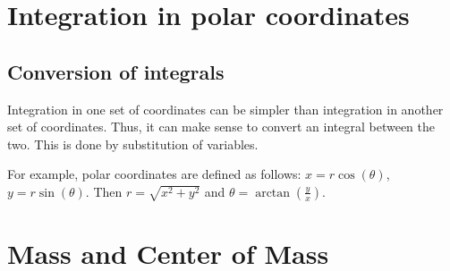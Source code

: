 \documentclass[letterpaper,11pt]{article}
\begin{document}
\section*{Integration in polar coordinates}
\subsection*{Conversion of integrals}
Integration in one set of coordinates can be simpler than integration in another set of coordinates.
Thus, it can make sense to convert an integral between the two.
This is done by substitution of variables.

For example, polar coordinates are defined as follows: $x = r \cos(\theta)$, $y = r \sin(\theta)$.
Then $r = \sqrt{x^2 + y^2}$ and $\theta = \arctan \left( \frac{y}{x} \right)$.
\section*{Mass and Center of Mass}
\end{document}
